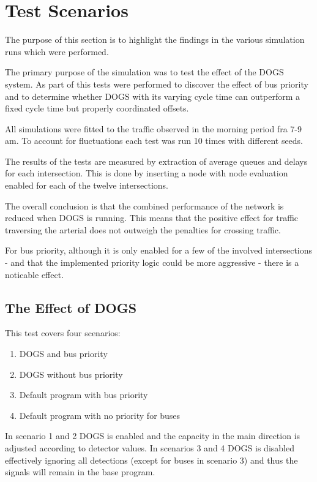 \section{Test Scenarios}
The purpose of this section is to highlight the findings in the various simulation runs which were performed.

The primary purpose of the simulation was to test the effect of the DOGS system. 
As part of this tests were performed to discover the effect of bus priority and to determine whether DOGS with its varying cycle time can outperform a fixed cycle time but properly coordinated offsets.

All simulations were fitted to the traffic observed in the morning period fra 7-9 am.
To account for fluctuations each test was run 10 times with different seeds.

The results of the tests are measured by extraction of average queues and delays for each intersection. This is done by inserting a node with node evaluation enabled for each of the twelve intersections.

The overall conclusion is that the combined performance of the network is reduced when DOGS is running. This means that the positive effect for traffic traversing the arterial does not outweigh the penalties for crossing traffic.

For bus priority, although it is only enabled for a few of the involved intersections - and that the implemented priority logic could be more aggressive - there is a noticable effect.

\subsection{The Effect of DOGS}
This test covers four scenarios:

\begin{enumerate}
\item DOGS and bus priority
\item DOGS without bus priority
\item Default program with bus priority
\item Default program with no priority for buses
\end{enumerate}

In scenario 1 and 2 DOGS is enabled and the capacity in the main direction is adjusted according to detector values. In scenarios 3 and 4 DOGS is disabled effectively ignoring all detections (except for buses in scenario 3) and thus the signals will remain in the base program.


